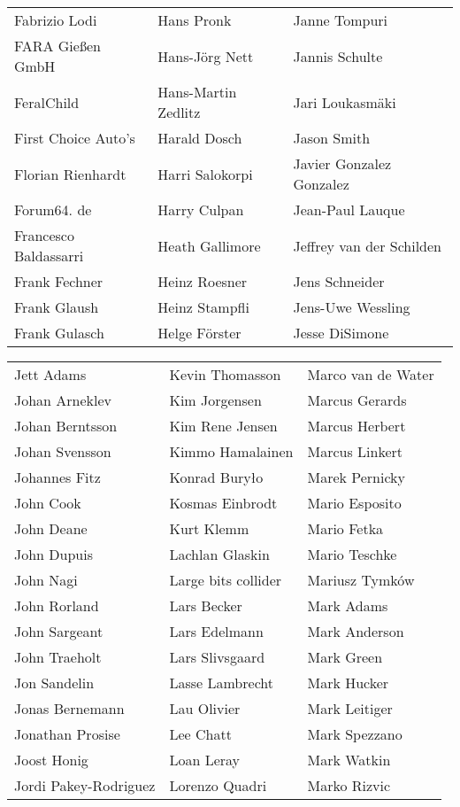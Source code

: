 \begin{small}
\begin{tabular}{p{4cm}p{4cm}p{4cm}}
Fabrizio Lodi & Hans Pronk & Janne Tompuri \\
FARA Gießen GmbH & Hans-Jörg Nett & Jannis Schulte \\
FeralChild & Hans-Martin Zedlitz & Jari Loukasmäki \\
First Choice Auto's & Harald Dosch & Jason Smith \\
Florian Rienhardt & Harri Salokorpi & Javier Gonzalez Gonzalez \\
Forum64. de & Harry Culpan & Jean-Paul Lauque \\
Francesco Baldassarri & Heath Gallimore & Jeffrey van der Schilden \\
Frank Fechner & Heinz Roesner & Jens Schneider \\
Frank Glaush & Heinz Stampfli & Jens-Uwe Wessling \\
Frank Gulasch & Helge Förster & Jesse DiSimone \\
\end{tabular}
\newpage
\setlength{\tabcolsep}{1mm}
\begin{tabular}{p{4cm}p{4cm}p{4cm}}
Jett Adams & Kevin Thomasson & Marco van de Water \\
Johan Arneklev & Kim Jorgensen & Marcus Gerards \\
Johan Berntsson & Kim Rene Jensen & Marcus Herbert \\
Johan Svensson & Kimmo Hamalainen & Marcus Linkert \\
Johannes Fitz & Konrad Buryło & Marek Pernicky \\
John Cook & Kosmas Einbrodt & Mario Esposito \\
John Deane & Kurt Klemm & Mario Fetka \\
John Dupuis & Lachlan Glaskin & Mario Teschke \\
John Nagi & Large bits collider & Mariusz Tymków \\
John Rorland & Lars Becker & Mark Adams \\
John Sargeant & Lars Edelmann & Mark Anderson \\
John Traeholt & Lars Slivsgaard & Mark Green \\
Jon Sandelin & Lasse Lambrecht & Mark Hucker \\
Jonas Bernemann & Lau Olivier & Mark Leitiger \\
Jonathan Prosise & Lee Chatt & Mark Spezzano \\
Joost Honig & Loan Leray & Mark Watkin \\
Jordi Pakey-Rodriguez & Lorenzo Quadri & Marko Rizvic \\

\end{tabular}
\end{small}

